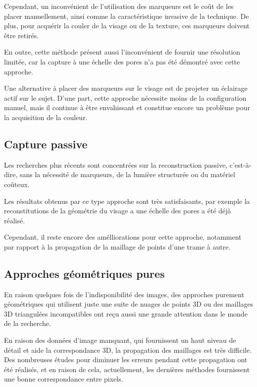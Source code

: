 \documentclass[a4paper,12pt]{article}
\begin{document}
Cependant, un inconvénient de l'utilisation des marqueurs est le coût
de les placer manuellement, ainsi comme la caractéristique invasive de
la technique. De plus, pour acquérir la couler de la visage ou de la
texture, ces marqueurs doivent être retirés. 

En outre, cette méthode présent aussi l'inconvénient de fournir une
résolution limitée, car la capture à une échelle des pores n'a pas été
démontré avec cette approche. 

Une alternative à placer des marqueurs sur le visage est de projeter
un éclairage actif sur le sujet. D'une part, cette approche nécessite
moins de la configuration manuel, mais il continue à être envahissant
et constitue encore un problème pour la acquisition de la couleur. 

\subsection*{Capture passive }

Les recherches plus récents sont concentrées sur la reconstruction
passive, c'est-à-dire, sans la nécessité de marqueurs, de la lumière
structurée ou du matériel coûteux. 

Les résultats obtenus par ce type approche sont très satisfaisants, par
exemple la reconstitutions de la géométrie du visage a une échelle
des pores a été déjà réalisé. 
 
Cependant, il reste encore des amélliorations pour cette approche,
notamment par rapport à la propagation de la maillage de points d'une
trame à autre. 

\subsection*{Approches géométriques pures}

En raison quelques fois de l'indisponibilité des images, des approches purement
géométriques qui utilisent juste une suite de nuages de points 3D ou
des maillages 3D triangulées incompatibles ont reçu aussi une grande attention
dans le monde de la recherche.

En raison des données d'image manquant, qui fournissent un haut niveau
de détail et aide la correspondance 3D, la propagation des maillages 
est très difficile. Des nombreuses études pour diminuer les erreurs
pendant cette propagation ont été réalisés, et en raison de cela,
actuellement, les dernières méthodes fournissent une bonne
correspondance entre pixels. %
\end{document}
